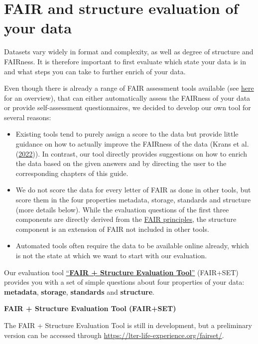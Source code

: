 \documentclass[
]{book}
\begin{document}
\hypertarget{evaluation}{%
\section{FAIR and structure evaluation of your data}\label{evaluation}}

Datasets vary widely in format and complexity, as well as degree of structure and FAIRness. It is therefore important to first evaluate which state your data is in and what steps you can take to further enrich of your data.

Even though there is already a range of FAIR assessment tools available (see \href{https://fairassist.org/}{here} for an overview), that can either automatically assess the FAIRness of your data or provide self-assessment questionnaires, we decided to develop our own tool for several reasons:

\begin{itemize}
\item
  Existing tools tend to purely assign a score to the data but provide little guidance on how to actually improve the FAIRness of the data (Krans et al. (\protect\hyperlink{ref-Krans_2022}{2022})). In contrast, our tool directly provides suggestions on how to enrich the data based on the given answers and by directing the user to the corresponding chapters of this guide.
\item
  We do not score the data for every letter of FAIR as done in other tools, but score them in the four properties metadata, storage, standards and structure (more details below). While the evaluation questions of the first three components are directly derived from the \protect\hyperlink{what-is-fair}{FAIR principles}, the structure component is an extension of FAIR not included in other tools.
\item
  Automated tools often require the data to be available online already, which is not the state at which we want to start with our evaluation.
\end{itemize}

Our evaluation tool \href{https://lter-life-experience.org/fairset/}{``\textbf{FAIR + Structure Evaluation Tool}''} (FAIR+SET) provides you with a set of simple questions about four properties of your data: \textbf{metadata}, \textbf{storage}, \textbf{standards} and \textbf{structure}.

{\textbf{FAIR + Structure Evaluation Tool (FAIR+SET)}}

The FAIR + Structure Evaluation Tool is still in development, but a preliminary version can be accessed through \url{https://lter-life-experience.org/fairset/}.
\end{document}
